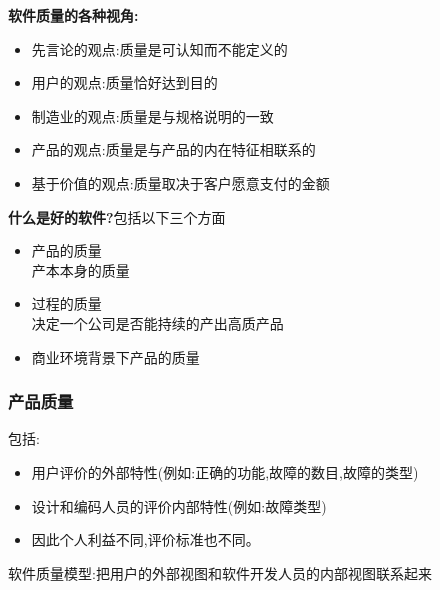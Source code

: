 \documentclass[UTF8,a4paper]{ctexart}
\newcommand{\spaceline}{\vspace{\baselineskip}}
\begin{document}
  \spaceline
  \textbf{软件质量的各种视角:}
  \begin{itemize}
    \item 先言论的观点:质量是可认知而不能定义的
    \item 用户的观点:质量恰好达到目的
    \item 制造业的观点:质量是与规格说明的一致
    \item 产品的观点:质量是与产品的内在特征相联系的
    \item 基于价值的观点:质量取决于客户愿意支付的金额
  \end{itemize}

  \spaceline
  \textbf{什么是好的软件?}包括以下三个方面
  \begin{itemize}
    \item 产品的质量\\
    产本本身的质量
    \item 过程的质量\\
    决定一个公司是否能持续的产出高质产品
    \item 商业环境背景下产品的质量
  \end{itemize}

  \subsubsection{产品质量}
  包括:
  \begin{itemize}
    \item 用户评价的外部特性(例如:正确的功能,故障的数目,故障的类型)
    \item 设计和编码人员的评价内部特性(例如:故障类型)
    \item 因此个人利益不同,评价标准也不同。
  \end{itemize}

  软件质量模型:把用户的外部视图和软件开发人员的内部视图联系起来
\end{document}
